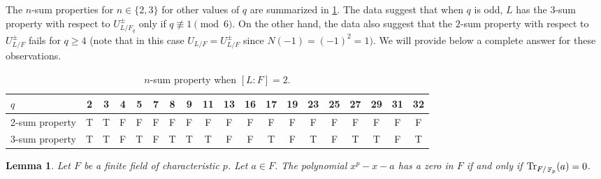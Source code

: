 \documentclass[11pt, a4paper]{amsart}
\newtheorem{lem}[thm]{Lemma}
\theoremstyle{definition}
\DeclareMathOperator{\F}{\mathbb{F}}
\numberwithin{equation}{section}
\begin{document}
The $n$-sum properties for $n \in \{2, 3\}$ for other values of $q$ are summarized in \cref{tab:sum-properties-transposed}.
The data suggest that when $q$ is odd, $L$ has the $3$-sum property with respect to $U_{L/F_q}^{\pm}$  only if $q \not \equiv 1 \pmod{6}.$ On the other hand, the data also suggest that the $2$-sum property with respect to $U_{L/F}^{\pm}$ fails for $q \geq 4$ (note that in this case $U_{L/F}=U_{L/F}^{\pm}$ since $N(-1)=(-1)^2=1).$ We will provide below a complete answer for these observations.
\begin{table}[htbp]
\centering
\begin{tabular}{|l|*{18}{c|}}
\hline
$q$ & 2 & 3 & 4 & 5 & 7 &  8 & 9 & 11 & 13 & 16 & 17 & 19 & 23 & 25 & 27 & 29 & 31 & 32 \\
\hline
2-sum property & T & T & F & F & F & F & F & F & F & F & F & F & F & F & F & F & F & F \\
\hline
3-sum property & T & T & F & T & F &T & T & T & F & F & T & F & T & F & T & T & F & T \\
\hline
\end{tabular}
\caption{$n$-sum property when $[L:F]=2$.}
\label{tab:sum-properties-transposed}
\end{table}






\begin{lem}
\label{lem:AS reducible}
    Let $F$ be a finite field of characteristic $p$. Let $a\in F$. The polynomial $x^p-x-a$ has a zero in $F$ if and only if ${\rm Tr}_{F/\F_p}(a)=0$.
\end{lem}
\end{document}
